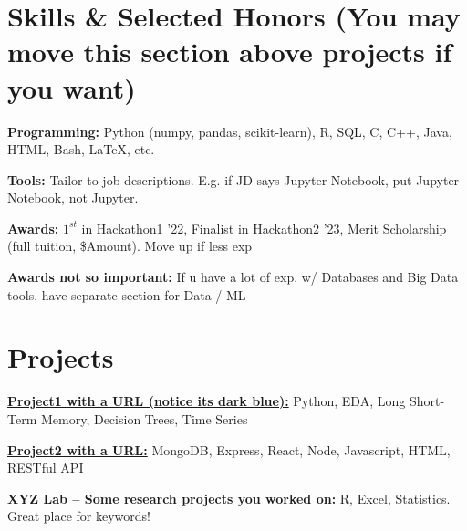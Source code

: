 \documentclass[letterpaper,10pt]{article}
\begin{document}
    \vspace{-5pt}

\section{Skills \& Selected Honors (You may move this section above projects if you want)}
     \textbf{Programming:} {Python (numpy, pandas, scikit-learn), R, SQL, C, C++, Java, HTML, Bash, \LaTeX, etc.}

    \textbf{Tools:} {Tailor to job descriptions. E.g. if JD says Jupyter Notebook, put Jupyter Notebook, not Jupyter.}
          
     \textbf{Awards:} {\textbf{$1^{st}$} in Hackathon1 '22, Finalist in Hackathon2 '23, Merit Scholarship (full tuition, \$Amount). Move up if less exp}

    \textbf{Awards not so important:} {If u have a lot of exp. w/ Databases and Big Data tools, have separate section for Data / ML}
    
    \vspace{-5pt}
    
\section{Projects}


          
     \href{https://calendly.com/nie-ryanz}{\textbf{Project1 with a URL (notice its dark blue):}} {Python, EDA, Long Short-Term Memory, Decision Trees, Time Series}
     
     \href{https://calendly.com/nie-ryanz}{\textbf{Project2 with a URL:}} {MongoDB, Express, React, Node, Javascript, HTML, RESTful API}

     \textbf{XYZ Lab -- Some research projects you worked on:} {R, Excel, Statistics. Great place for keywords!}

\end{document}

